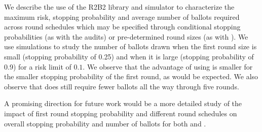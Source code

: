We describe the use of the R2B2 library and simulator to characterize the maximum risk, stopping probability and average number of ballots required across round schedules which may be specified through conditional stopping probabilities (as with the \BRAVO audits) or pre-determined round sizes (as with \Minerva). We use simulations to study the number of ballots drawn when the first round size is small (stopping probability of 0.25) and when it is large (stopping probability of 0.9) for a risk limit of $0.1$. We observe that the advantage of using \Minerva is smaller for the smaller stopping probability of the first round, as would be expected. We also observe that \Minerva does still require fewer ballots all the way through five rounds.  

A promising direction for future work would be a more detailed study of the impact of first round stopping probability and different round schedules on overall stopping probability and number of ballots for both \Minerva and \BRAVO. 